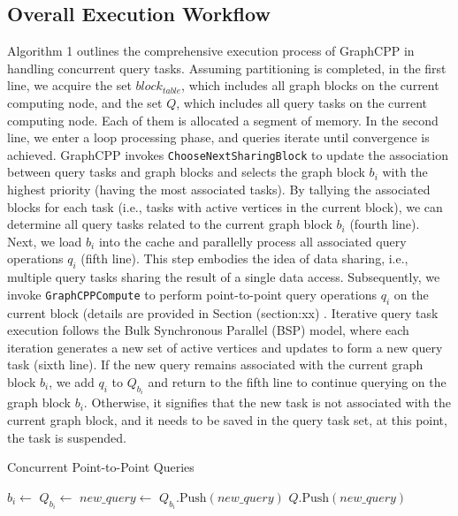 \documentclass[lettersize,journal]{IEEEtran} %
\begin{document}
\subsection{Overall Execution Workflow}
Algorithm 1 outlines the comprehensive execution process of GraphCPP in handling concurrent query tasks. Assuming partitioning is completed, in the first line, we acquire the set \(block_{table}\), which includes all graph blocks on the current computing node, and the set \(Q\), which includes all query tasks on the current computing node. Each of them is allocated a segment of memory. In the second line, we enter a loop processing phase, and queries iterate until convergence is achieved. GraphCPP invokes \texttt{ChooseNextSharingBlock} to update the association between query tasks and graph blocks and selects the graph block \(b_i\) with the highest priority (having the most associated tasks). By tallying the associated blocks for each task (i.e., tasks with active vertices in the current block), we can determine all query tasks related to the current graph block \(b_i\) (fourth line). Next, we load \(b_i\) into the cache and parallelly process all associated query operations \(q_i\) (fifth line). This step embodies the idea of data sharing, i.e., multiple query tasks sharing the result of a single data access. Subsequently, we invoke \texttt{GraphCPPCompute} to perform point-to-point query operations \(q_i\) on the current block (details are provided in Section (section:xx)  . Iterative query task execution follows the Bulk Synchronous Parallel (BSP) model, where each iteration generates a new set of active vertices and updates to form a new query task (sixth line). If the new query remains associated with the current graph block \(b_i\), we add \(q_i\) to \(Q_{b_i}\) and return to the fifth line to continue querying on the graph block \(b_i\). Otherwise, it signifies that the new task is not associated with the current graph block, and it needs to be saved in the query task set, at this point, the task is suspended.

\begin{algorithm}
\caption{Concurrent Point-to-Point Queries}
\label{alg:concurrent_queries}
\begin{algorithmic}[1]

    \State {}
        \State $b_i \gets$ 
        \State $Q_{b_i} \gets$ 
            \State $new\_query \gets$ 
                \State $Q_{b_i}.\text{Push}(new\_query)$
            \Else
                \State $Q.\text{Push}(new\_query)$
            \EndIf
        \EndFor
    \EndWhile
\EndFunction

\end{algorithmic}
\end{algorithm}
  
\end{document}
